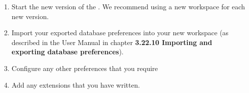 \begin{enumerate}
\item Start the new version of the \ite{}. We recommend using a new workspace for each new version. 
\item Import your exported database preferences into your new workspace  (as described in the User Manual in chapter \textbf{3.22.10 Importing and exporting database preferences}).
\item Configure any other preferences that you require
\item Add any extensions that you have written. 
\end{enumerate}
